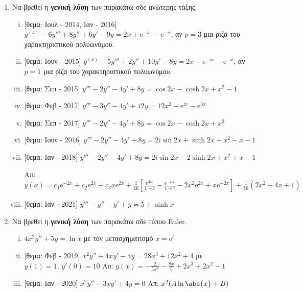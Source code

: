 \documentclass[a4paper,table]{report}
\begin{document}
\begin{center}
  \minibox{\large \bfseries \textcolor{Col1}{Συνήθεις Διαφορικές Εξισώσεις - 2ης τάξης}}
\end{center}

\vspace{\baselineskip}


\begin{enumerate}
  \item Να βρεθεί η \textbf{γενική λύση} των παρακάτω σδε ανώτερης τάξης.
    \begin{enumerate}[i)]
      \item \textcolor{Col1}{[θεμα: Ιουλ - 2014, Ιαν - 2016]} 
        $ y^{(4)} - 6y''' +8y'' +6y' -9y=2x+ \mathrm{e}^{-ix} - \mathrm{e}^{-x} $, 
        αν $ p=3 $ μια ρίζα του χαρακτηριστικού πολυωνύμου.
      \item \textcolor{Col1}{[θεμα: Ιουν - 2015]} 
        $ y^{(4)} - 5y''' +2y'' +10y'-8y=2x+ \mathrm{e}^{-ix} - \mathrm{e}^{-x} $, 
        αν $ p=1 $ μια ρίζα του χαρακτηριστικού πολυωνύμου.
      \item \textcolor{Col1}{[θεμα: Σεπ - 2015]} 
        $ y''' -2y''-4y'+8y= \cos{2x} - \cosh{2x} + x^{2}-1 $
      \item \textcolor{Col1}{[θεμα: Φεβ - 2017]}
        $ y'''-3y''-4y'+12y=12x^{2}+ \mathrm{e}^{ix} - \mathrm{e}^{3x} $
      \item \textcolor{Col1}{[θεμα: Σεπ - 2017]} 
        $ y''' -2y''-4y'+8y= \cos{2x} - \cosh{2x} + x^{2} $
      \item \textcolor{Col1}{[θεμα: Ιουν - 2016]} 
        $ y''' -2y'' -4y' +8y= 2i \sin{2x} + \sinh{2x} + x^{2}-x-1 $ 
      \item \textcolor{Col1}{[θεμα: Ιαν - 2018]} 
        $ y''' -2y'' -4y' +8y= 2i \sin{2x} -2 \sinh{2x} + x^{2}+x-1 $

        \hfill Απ: $ y(x) = c_{1} \mathrm{e}^{-2x} + c_{2} \mathrm{e}^{2x} + c_{3} x
        \mathrm{e}^{2x} + \frac{1}{16} [\frac{\mathrm{e}^{2ix}}{1-i} -
        \frac{\mathrm{e}^{-2ix}}{1+i} - 2x^{2} \mathrm{e}^{2x} + x \mathrm{e}^{-2x}] + 
        \frac{1}{16} (2x^{2} + 4x+1) $ 
      \item \textcolor{Col1}{[θεμα: Ιαν - 2021]} 
        $ y''' -y'' -y'+y=5+ \sinh{x} $
    \end{enumerate}

  \item Να βρεθεί η \textbf{γενική λύση} των παρακάτω σδε τύπου \textlatin{Euler}.
    \begin{enumerate}[i)]
      \item $ 4x^{2}y'' + 5y= \ln{x} $ με τον μετασχηματισμό $ x= \mathrm{e}^{t} $ 
      \item \textcolor{Col1}{[θεμα: Φεβ - 2019]} 
        $ x^{2}y''+4xy'-4y=28x^{3}+12x^{2}+4 $ με $ y(1)=1, \, y'(0)=10 $ 
        \hfill Απ: $ y(x) = - \frac{2}{5x^{4}} - \frac{8x}{5} + 2x^{3}+2x^{2}-1 $ 
      \item \textcolor{Col1}{[θεμα: Ιαν - 2020]} $ x^{2}y''-3xy'+4y=0 $ 
        \hfill Απ: $ x^{2}(A \ln{\abs{x} +B} ) $
    \end{enumerate}


\end{enumerate}
\end{document}

